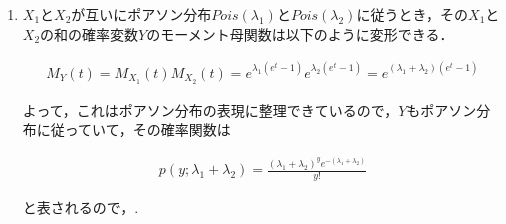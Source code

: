 \documentclass[a4paper,10pt]{jarticle}
\begin{document}
\begin{enumerate}
	よって，ここに$t=0$を代入すると，

	\begin{equation}
		\label{equ7}
		\begin{split}
		E[X] = M'(0) = \lambda e^0 e^{\lambda(e^0-1)} = \lambda \cdot 1 \cdot 1 = \lambda
		\end{split}
	\end{equation}
	
  と以上のようになり，求める$X$の期待値$E[X]$は\fbox{$\lambda$}である．

	次に，$X^2$の期待値は，$M'(t)$をさらに微分して，$t=0$を代入することによって得られる．まず微分をすると，

	\begin{equation}
		\label{equ8}
		\begin{split}
		M''(t) = (\lambda e^{\lambda(e^t-1)+t})' = \lambda(\lambda e^t +1)e^{\lambda(e^t-1)+t}
		\end{split}
	\end{equation}

	よって，$t=0$を代入すると，$X^2$の期待値は，

	\begin{equation}
		\label{equ9}
		\begin{split}
		E[X^2] = M''(0) = \lambda(\lambda e^0 +1)e^{\lambda(e^0-1)+0} = \lambda (\lambda \cdot 1 + 1) \cdot 1 = \lambda ^2 + \lambda
		\end{split}
	\end{equation}

と以上のようになり，$X^2$の期待値はである．

	 \vspace{6mm}


	 \item  $X_1$と$X_2$が互いにポアソン分布$Pois(\lambda_1)$と$Pois(\lambda_2)$に従うとき，その$X_1$と$X_2$の和の確率変数$Y$のモーメント母関数は以下のように変形できる．
	 
	 \begin{equation}
		\label{equ10}
		\begin{split}
		M_Y(t) = M_{X_1}(t)M_{X_2}(t) = e^{\lambda_1(e^t-1)}e^{\lambda_2(e^t-1)} = e^{(\lambda_1 + \lambda_2)(e^t-1)}
		\end{split}
	\end{equation}
	
よって，これはポアソン分布の表現に整理できているので，$Y$もポアソン分布に従っていて，その確率関数は

\begin{equation}
	\label{equ11}
	\begin{split}
	p(y;\lambda_1 + \lambda_2) = \frac{(\lambda_1 + \lambda_2)^y e^{-(\lambda_1 + \lambda_2)}}{y!}
	\end{split}
\end{equation}

と表されるので，.
	\end{enumerate}
\end{document}
